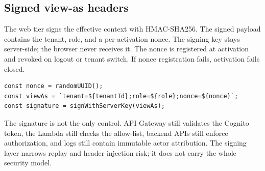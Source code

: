 \subsection{Signed view-as headers}
\label{sec:signed_headers}

The web tier signs the effective context with HMAC-SHA256. The signed payload contains the tenant, role, and a per-activation nonce. The signing key stays server-side; the browser never receives it. The nonce is registered at activation and revoked on logout or tenant switch. If nonce registration fails, activation fails closed.

\begin{lstlisting}[style=typescript, caption={Sanitized view-as activation sketch.}, label={lst:viewas_sign}]
const nonce = randomUUID();
const viewAs = `tenant=${tenantId};role=${role};nonce=${nonce}`;
const signature = signWithServerKey(viewAs);
\end{lstlisting}

The signature is not the only control. API Gateway still validates the Cognito token, the Lambda still checks the allow-list, backend APIs still enforce authorization, and logs still contain immutable actor attribution. The signing layer narrows replay and header-injection risk; it does not carry the whole security model.
